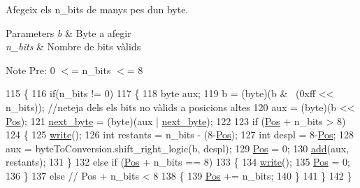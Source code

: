 Afegeix els n\+\_\+bits de manys pes d\textquotesingle{}un byte. 


\begin{DoxyParams}{Parameters}
{\em b} & Byte a afegir \\
\hline
{\em n\+\_\+bits} & Nombre de bits vàlids \\
\hline
\end{DoxyParams}
\begin{DoxyNote}{Note}
Pre\+: 0 $<$= n\+\_\+bits $<$= 8 
\end{DoxyNote}

\begin{DoxyCode}
115     \{
116         \textcolor{keywordflow}{if}(n\_bits != 0)
117         \{
118             byte aux;
119             b = (byte)(b & ~(0xff << n\_bits)); \textcolor{comment}{//neteja dels els bits no vàlids a posicions altes}
120             aux = (byte)(b << \hyperlink{classpersistencia_1_1output_1_1Output_a3709182600423f7e57644ccdd0016f22}{Pos});
121             \hyperlink{classpersistencia_1_1output_1_1Output_aca83082ef84ec2e169b6fa34618d0773}{next\_byte} = (byte)(aux | \hyperlink{classpersistencia_1_1output_1_1Output_aca83082ef84ec2e169b6fa34618d0773}{next\_byte});
122             
123             \textcolor{keywordflow}{if} (\hyperlink{classpersistencia_1_1output_1_1Output_a3709182600423f7e57644ccdd0016f22}{Pos} + n\_bits > 8) 
124             \{
125                 \hyperlink{classpersistencia_1_1output_1_1Output_a57be8c4ed429f03caa5c2bcc97e2260d}{write}();
126                 \textcolor{keywordtype}{int} restants = n\_bits - (8-\hyperlink{classpersistencia_1_1output_1_1Output_a3709182600423f7e57644ccdd0016f22}{Pos});
127                 \textcolor{keywordtype}{int} despl = 8-\hyperlink{classpersistencia_1_1output_1_1Output_a3709182600423f7e57644ccdd0016f22}{Pos};
128                 aux = byteToConversion.shift\_right\_logic(b, despl);
129                 \hyperlink{classpersistencia_1_1output_1_1Output_a3709182600423f7e57644ccdd0016f22}{Pos} = 0;
130                 \hyperlink{classpersistencia_1_1output_1_1Output_adc03a0dd7a94da21fe8432064a4eec09}{add}(aux, restants);
131             \}
132             \textcolor{keywordflow}{else} \textcolor{keywordflow}{if} (\hyperlink{classpersistencia_1_1output_1_1Output_a3709182600423f7e57644ccdd0016f22}{Pos} + n\_bits == 8) 
133             \{
134                 \hyperlink{classpersistencia_1_1output_1_1Output_a57be8c4ed429f03caa5c2bcc97e2260d}{write}();
135                 \hyperlink{classpersistencia_1_1output_1_1Output_a3709182600423f7e57644ccdd0016f22}{Pos} = 0;
136             \}
137             \textcolor{keywordflow}{else} \textcolor{comment}{// Pos + n\_bits < 8}
138             \{
139                 \hyperlink{classpersistencia_1_1output_1_1Output_a3709182600423f7e57644ccdd0016f22}{Pos} += n\_bits;
140             \}
141         \}
142     \}
\end{DoxyCode}
\mbox{\label{classpersistencia_1_1output_1_1Output_a0882482880e36bf5dc9bd78bb36cec75}} 
